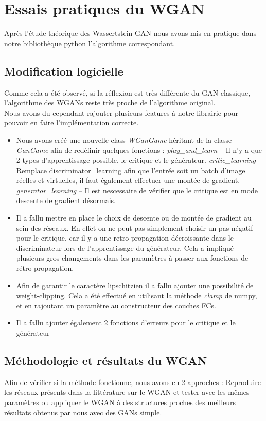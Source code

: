  \section{Essais pratiques du WGAN}
 	Après l'étude théorique des Wassertstein GAN nous avons mis en pratique dans notre bibliothèque python l'algorithme correspondant.

 \subsection{Modification logicielle}
 	Comme cela a été observé, si la réflexion est très différente du GAN classique, l'algorithme des WGANs reste très proche de l'algorithme original. \\
 	Nous avons du cependant rajouter plusieurs features à notre librairie pour pouvoir en faire l'implémentation correcte.

 	\begin{itemize}
 		\item Nous avons créé une nouvelle class \emph{WGanGame} héritant de la classe \emph{GanGame} afin de redéfinir quelques fonctions :
 			\subitem \emph{play\_and\_learn} -- Il n'y a que 2 types d'apprentissage possible, le critique et le générateur.
 			\subitem \emph{critic\_learning} -- Remplace discriminator\_learning afin que l'entrée soit un batch d'image réelles et virtuelles, il faut également effectuer une montée de gradient.
 			\subitem \emph{generator\_learning}  -- Il est nescessaire de vérifier que le critique est en mode descente de gradient désormais.
 		\item Il a fallu mettre en place le choix de descente ou de montée de gradient au sein des réseaux.
 		En effet on ne peut pas simplement choisir un pas négatif pour le critique, car il y a une retro-propagation décroissante dans le discriminateur lors de l'apprentissage du générateur. Cela a impliqué plusieurs gros changements dans les paramètres à passer aux fonctions de rétro-propagation.
 		\item Afin de garantir le caractère lipschitzien il a fallu ajouter une possibilité de weight-clipping. Cela a été effectué en utilisant la méthode \emph{clamp} de numpy, et en rajoutant un paramètre au constructeur des couches FCs.
 		\item Il a fallu ajouter également 2 fonctions d'erreurs pour le critique et le générateur

 	\end{itemize}
 \subsection{Méthodologie et résultats du WGAN}
 	Afin de vérifier si la méthode fonctionne, nous avons eu 2 approches : Reproduire les réseaux présents dans la littérature sur le WGAN et tester avec les mêmes paramètres ou appliquer le WGAN à des structures proches des meilleurs résultats obtenus par nous avec des GANs simple. 

